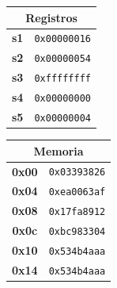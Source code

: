 \documentclass[letterpaper,12pt]{article}
\begin{document}
\begin{enumerate}
    \begin{table}[H]
        \centering
        \begin{minipage}[t]{0.45\textwidth}
            \centering
            \begin{tabular}{|c|c|}
                \hline
                \multicolumn{2}{|c|}{\textbf{Registros}} \\
                \hline
                \textbf{s1} & \texttt{0x00000016} \\
                \hline
                \textbf{s2} & \texttt{0x00000054} \\
                \hline
                \textbf{s3} & \texttt{0xffffffff} \\
                \hline
                \textbf{s4} & \texttt{0x00000000} \\
                \hline
                \textbf{s5} & \texttt{0x00000004} \\
                \hline
            \end{tabular}
        \end{minipage}
        \hfill
        \begin{minipage}[t]{0.45\textwidth}
            \centering
            \begin{tabular}{|c|c|}
                \hline
                \multicolumn{2}{|c|}{\textbf{Memoria}} \\
                \hline
                \textbf{0x00} & \texttt{0x03393826} \\
                \hline
                \textbf{0x04} & \texttt{0xea0063af} \\
                \hline
                \textbf{0x08} & \texttt{0x17fa8912} \\
                \hline
                \textbf{0x0c} & \texttt{0xbc983304} \\
                \hline
                \textbf{0x10} & \texttt{0x534b4aaa} \\
                \hline
                \textbf{0x14} & \texttt{0x534b4aaa} \\
                \hline
            \end{tabular}
        \end{minipage}
    \end{table}


\end{enumerate}
\end{document}
